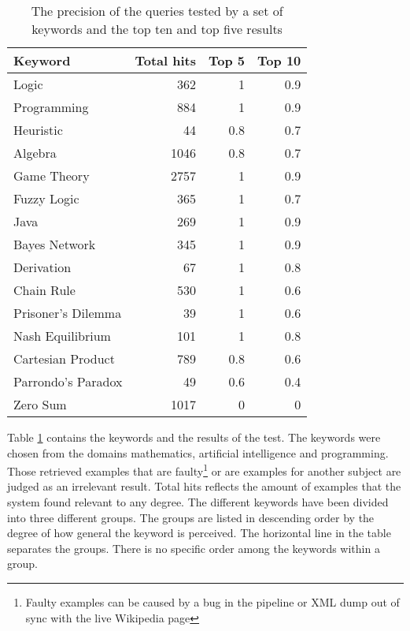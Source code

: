 

\begin{table}[h]
\centering
\small
\begin{tabular} {|| p{15em} | r | r | r ||} 
 \hline
 Keyword & Total hits & Top 5 & Top 10 \\ [0.5ex] 
 \hline

Logic & 362 & 1 & 0.9 \\
Programming & 884 & 1 & 0.9 \\
Heuristic & 44 & 0.8 & 0.7 \\
Algebra & 1046 & 0.8 & 0.7 \\
Game Theory & 2757 & 1 & 0.9 \\
\hline
Fuzzy Logic & 365 & 1 & 0.7 \\
Java & 269 & 1 & 0.9 \\
Bayes Network & 345 & 1 & 0.9 \\
Derivation & 67 & 1 & 0.8 \\
\hline
Chain Rule & 530 & 1 & 0.6 \\
Prisoner's Dilemma & 39 & 1 & 0.6 \\
Nash Equilibrium & 101 & 1 & 0.8 \\
Cartesian Product & 789 & 0.8 & 0.6 \\
Parrondo's Paradox & 49 & 0.6 & 0.4 \\
Zero Sum & 1017 & 0 & 0 \\

 \hline
\end{tabular}
\caption{The precision of the queries tested by a set of keywords and the top ten and top five results}
\label{table:precision_test}
\end{table}

Table \ref{table:precision_test} contains the keywords and the results of the test. The keywords were chosen from the domains mathematics, artificial intelligence and programming. Those retrieved examples that are faulty\footnote{Faulty examples can be caused by a bug in the pipeline or XML dump out of sync with the live Wikipedia page} or are examples for another subject are judged as an irrelevant result. Total hits reflects the amount of examples that the system found relevant to any degree. The different keywords have been divided into three different groups. The groups are listed in descending order by the degree of how general the keyword is perceived. The horizontal line in the table separates the groups. There is no specific order among the keywords within a group.

